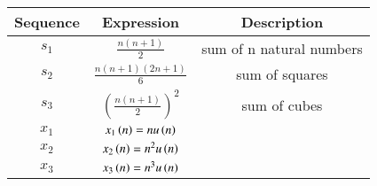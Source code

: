 \begin{tabular}{|c|c|c|}
    \hline
    \textbf{Sequence} & \textbf{Expression} & \textbf{Description} \\
    \hline
    \(s_1\) & \(\frac{n(n+1)}{2}\) & sum of n natural numbers\\
    \hline
    \(s_2\) & \(\frac{n(n+1)(2n+1)}{6}\) & sum of squares\\
    \hline
    \(s_3\) & \(\left(\frac{n(n+1)}{2}\right)^2\) & sum of cubes \\
    \hline
    \(x_1\) & \(x_1\left( n \right) = n u\left( n \right)\) & \\
    \hline
    \(x_2\) & \(x_2\left( n \right) = n^2 u\left( n \right)\) &  \\
    \hline
    \(x_3\) & \(x_3\left( n \right) = n^3 u\left( n \right)\) & \\
    \hline
\end{tabular}

